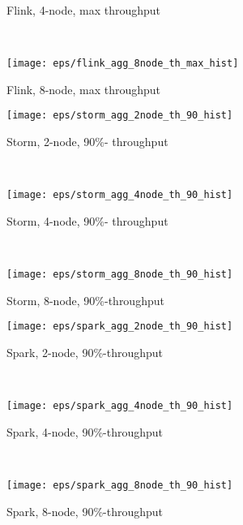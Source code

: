 \begin{figure*}
\begin{subfigure}[b]{0.3\textwidth}
        \caption{Flink, 4-node, max  throughput }
    \end{subfigure}
    ~ 
    \begin{subfigure}[b]{0.3\textwidth}
        \texttt{[image: eps/flink\_agg\_8node\_th\_max\_hist]}

        \caption{Flink, 8-node, max  throughput }
        
    \end{subfigure}




    \begin{subfigure}[b]{0.3\textwidth}
        \texttt{[image: eps/storm\_agg\_2node\_th\_90\_hist]}

        \caption{Storm, 2-node, 90\%- throughput }
    \end{subfigure}
    ~ 
    \begin{subfigure}[b]{0.3\textwidth}
        \texttt{[image: eps/storm\_agg\_4node\_th\_90\_hist]}

        \caption{Storm, 4-node, 90\%- throughput }
    \end{subfigure}
    ~ 
    \begin{subfigure}[b]{0.3\textwidth}
        \texttt{[image: eps/storm\_agg\_8node\_th\_90\_hist]}

        \caption{Storm, 8-node,  90\%-throughput }
        
    \end{subfigure}



    \begin{subfigure}[b]{0.3\textwidth}
        \texttt{[image: eps/spark\_agg\_2node\_th\_90\_hist]}

        \caption{Spark, 2-node,  90\%-throughput }
    \end{subfigure}
    ~ 
    \begin{subfigure}[b]{0.3\textwidth}
        \texttt{[image: eps/spark\_agg\_4node\_th\_90\_hist]}

        \caption{Spark, 4-node,  90\%-throughput }
    \end{subfigure}
    ~ 
    \begin{subfigure}[b]{0.3\textwidth}
        \texttt{[image: eps/spark\_agg\_8node\_th\_90\_hist]}

        \caption{Spark, 8-node,  90\%-throughput }
        
    \end{subfigure}




\end{figure*}

